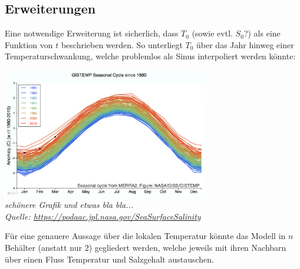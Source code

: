 \documentclass[11pt,a4paper]{article}
\begin{document}
	\subsection*{Erweiterungen}
	
	Eine notwendige Erweiterung ist sicherlich, dass \(T_0\) (sowie evtl. \(S_0\)?) als eine Funktion von \(t\) beschrieben werden. So unterliegt \(T_0\) über das Jahr hinweg einer Temperaturschwankung, welche problemlos als Sinus interpoliert werden könnte:
	
	\begin{center}
	\includegraphics[width=9cm]{Diagramme/GISTEMP.png} \\
	\textit{schönere Grafik und etwas bla bla...\\
	Quelle: \url{https://podaac.jpl.nasa.gov/SeaSurfaceSalinity}}
	\end{center}	
	
	Für eine genauere Aussage über die lokalen Temperatur könnte das Modell in \(n\) Behälter (anstatt nur 2) gegliedert werden, welche jeweils mit ihren Nachbarn über einen Fluss Temperatur und Salzgehalt austauschen.
\end{document}
